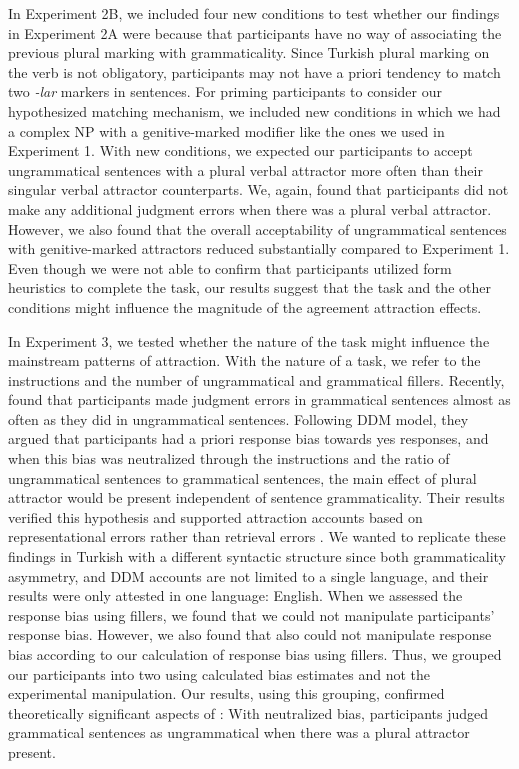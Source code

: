 In Experiment 2B, we included four new conditions to test whether our findings in Experiment 2A were because that participants have no way of associating the previous plural marking with grammaticality. Since Turkish plural marking on the verb is not obligatory, participants may not have a priori tendency to match two \emph{-lar} markers in sentences. For priming participants to consider our hypothesized matching mechanism, we included new conditions in which we had a complex NP with a genitive-marked modifier like the ones we used in Experiment 1. With new conditions, we expected our participants to accept ungrammatical sentences with a plural verbal attractor more often than their singular verbal attractor counterparts. We, again, found that participants did not make any additional judgment errors when there was a plural verbal attractor. However, we also found that the overall acceptability of ungrammatical sentences with genitive-marked attractors reduced substantially compared to Experiment 1. Even though we were not able to confirm that participants utilized form heuristics to complete the task, our results suggest that the task and the other conditions might influence the magnitude of the agreement attraction effects.

In Experiment 3, we tested whether the nature of the task might influence the mainstream patterns of attraction. With the nature of a task, we refer to the instructions and the number of ungrammatical and grammatical fillers. Recently,  found that participants made judgment errors in grammatical sentences almost as often as they did in ungrammatical sentences. Following \cites{Ratcliff1978} DDM model, they argued that participants had a priori response bias towards yes responses, and when this bias was neutralized through the instructions and the ratio of ungrammatical sentences to grammatical sentences, the main effect of plural attractor would be present independent of sentence grammaticality. Their results verified this hypothesis and supported attraction accounts based on representational errors rather \citep{EberhardEtAl2005} than retrieval errors . We wanted to replicate these findings in Turkish with a different syntactic structure since both grammaticality asymmetry, and DDM accounts are not limited to a single language, and their results were only attested in one language: English. When we assessed the response bias using fillers, we found that we could not manipulate participants' response bias. However, we also found that  also could not manipulate response bias according to our calculation of response bias using fillers. Thus, we grouped our participants into two using calculated bias estimates and not the experimental manipulation. Our results, using this grouping, confirmed theoretically significant aspects of : With neutralized bias, participants judged grammatical sentences as ungrammatical when there was a plural attractor present. 

